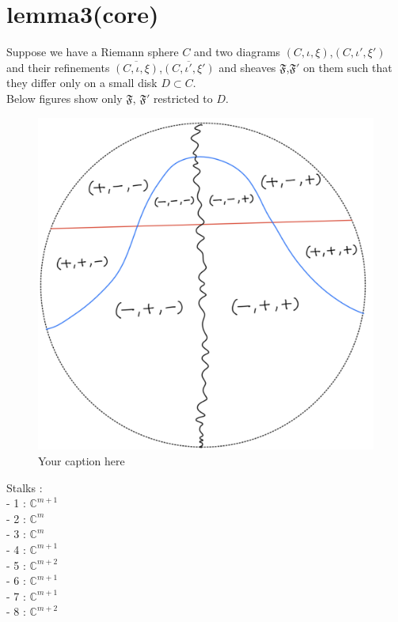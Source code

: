 \section{lemma3(core)}
\begin{lemma}
\end{lemma}
Suppose we have a Riemann sphere $C$ and two diagrams $(C,\iota,\xi)$,$(C,\iota',\xi')$ and their refinements $\overline{(C,\iota,\xi)}$,$\overline{(C,\iota',\xi')}$ and sheaves $\mathfrak{F}$,$\mathfrak{F}'$ on them such that they differ only on a small disk $D\subset C$. \\

Below figures show only $\mathfrak{F}$, $\mathfrak{F}'$ restricted to $D$.


\begin{figure}[H] %
    \centering
    \includegraphics[width=\linewidth]{diagrams/lemma3/1.png} %
    \caption{Your caption here}
    \label{fig:your-label}
\end{figure}

Stalks :\\

- 1 : $\mathbb{C}^{m+1}$\\
- 2 : $\mathbb{C}^{m}$\\
- 3 : $\mathbb{C}^{m}$\\
- 4 : $\mathbb{C}^{m+1}$\\
- 5 : $\mathbb{C}^{m+2}$\\
- 6 : $\mathbb{C}^{m+1}$\\
- 7 : $\mathbb{C}^{m+1}$\\
- 8 : $\mathbb{C}^{m+2}$\\

